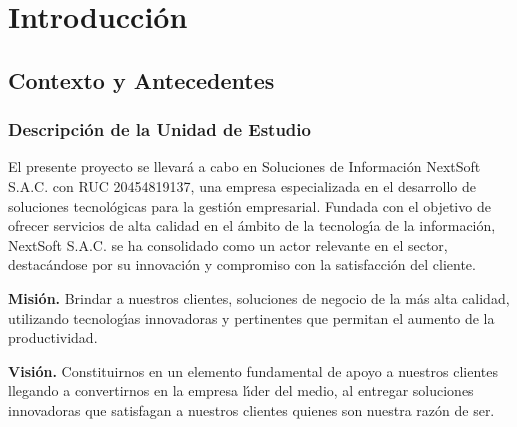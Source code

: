 \documentclass[stu, 12pt, letterpaper, donotrepeattitle, floatsintext, natbib]{apa7}
\begin{document}
\section{Introducci\'on}
\subsection{Contexto y Antecedentes}
\subsubsection{Descripci\'on de la Unidad de Estudio}
El presente proyecto se llevar\'a a cabo en Soluciones de Informaci\'on NextSoft S.A.C. con RUC 20454819137, una empresa especializada en el desarrollo de soluciones tecnol\'ogicas para la gesti\'on empresarial.
Fundada con el objetivo de ofrecer servicios de alta calidad en el \'ambito de la tecnolog\'{\i}a de la informaci\'on, NextSoft S.A.C. se ha consolidado como un actor relevante en el sector, destac\'andose
por su innovaci\'on y compromiso con la satisfacci\'on del cliente.

\textbf{Misi\'on. }Brindar a nuestros clientes, soluciones de negocio de la m\'as alta calidad, utilizando tecnolog\'{\i}as innovadoras y pertinentes que permitan el aumento de la productividad.

\textbf{Visi\'on. }Constituirnos en un elemento fundamental de apoyo a nuestros clientes llegando a convertirnos en la empresa l\'{\i}der del medio, al entregar soluciones innovadoras que satisfagan a nuestros clientes quienes
son nuestra raz\'on de ser.
\end{document}
